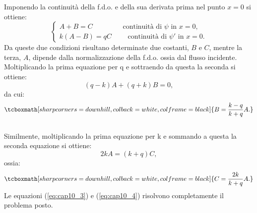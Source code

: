 Imponendo la continuità della f.d.o. e della sua derivata prima nel punto $x=0$ si ottiene:
	\begin{equation}
		\begin{cases}
		A+B=C \quad \qquad \quad \textrm{ continuità di }\psi\textrm{ in }x=0,\\
		k\left(A-B \right) =qC\qquad \textrm{ continuità di }\psi '\textrm{ in }x=0.
		\end{cases}
	\end{equation}
Da queste due condizioni risultano determinate due costanti, $B$ e $C$, mentre la terza, $A$, dipende dalla normalizzazione della f.d.o. ossia dal flusso incidente.\\

Moltiplicando la prima equazione per q e sottraendo da questa la seconda si ottiene:
	\begin{equation}
		\left( q-k \right) A + \left( q+k \right)B=0,
	\end{equation}
da cui:
	\begin{equation}
		\tcboxmath[sharp corners=downhill, colback=white, colframe=black]{
			B= \frac{k-q}{k+q}A.
			}
	\label{eq:cap10_3}
	\end{equation}\\
	
Similmente, moltiplicando la prima equazione per k e sommando a questa la seconda equazione si ottiene:
	\begin{equation}
		2kA=\left( k+q \right)C,
	\end{equation}
ossia:
	\begin{equation}
		\tcboxmath[sharp corners=downhill, colback=white, colframe=black]{
			C=\frac{2k}{k+q}A.
			}
	\label{eq:cap10_4}
	\end{equation}
Le equazioni (\ref{eq:cap10_3}) e (\ref{eq:cap10_4}) risolvono completamente il problema posto.\\

